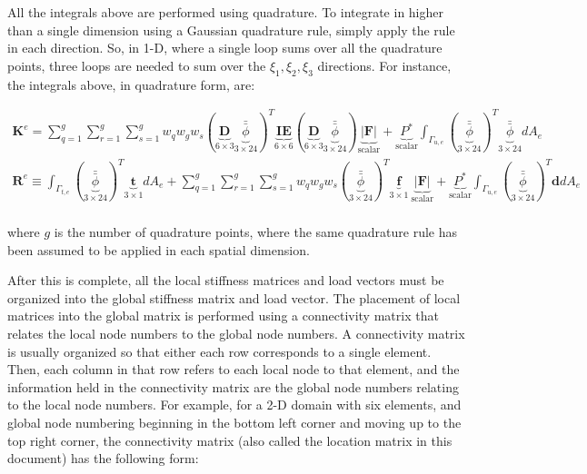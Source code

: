 \documentclass[10pt]{article}
\begin{document}
All the integrals above are performed using quadrature. To integrate in higher than a single dimension using a Gaussian quadrature rule, simply apply the rule in each direction. So, in 1-D, where a single loop sums over all the quadrature points, three loops are needed to sum over the \(\xi_1,\xi_2,\xi_3\) directions. For instance, the integrals above, in quadrature form, are:

\begin{equation}
\label{eq:FEWeakForm_element3}
\begin{aligned}
\textbf{K}^e=\sum_{q=1}^g\sum_{r=1}^g\sum_{s=1}^gw_qw_gw_s(\underbrace{\textbf{D}}_{6\times3}\underbrace{\bar{\bar{\phi}}}_{3\times24})^T\underbrace{\textbf{IE}}_{6\times6}(\underbrace{\textbf{D}}_{6\times3}\underbrace{\bar{\bar{\phi}}}_{3\times24})\underbrace{|\textbf{F}|}_\text{scalar} +\underbrace{P^{*}}_\text{scalar}\int_{\Gamma_{u,e}}(\underbrace{\bar{\bar{\phi}}}_{3\times24})^T\underbrace{\bar{\bar{\phi}}}_{3\times24}dA_e\\
\textbf{R}^e\equiv\int_{\Gamma_{t,e}}(\underbrace{\bar{\bar{\phi}}}_{3\times24})^T\underbrace{\textbf{t}}_{3\times1}dA_e+\sum_{q=1}^g\sum_{r=1}^g\sum_{s=1}^gw_qw_gw_s(\underbrace{\bar{\bar{\phi}}}_{3\times24})^T\underbrace{\textbf{f}}_{3\times1}\ \underbrace{|\textbf{F}|}_\text{scalar}+\underbrace{P^{*}}_\text{scalar}\int_{\Gamma_{u,e}}(\underbrace{\bar{\bar{\phi}}}_{3\times24})^T\textbf{d}dA_e\\
\end{aligned}
\end{equation}

where \(g\) is the number of quadrature points, where the same quadrature rule has been assumed to be applied in each spatial dimension.







After this is complete, all the local stiffness matrices and load vectors must be organized into the global stiffness matrix and load vector. The placement of local matrices into the global matrix is performed using a connectivity matrix that relates the local node numbers to the global node numbers. A connectivity matrix is usually organized so that either each row corresponds to a single element. Then, each column in that row refers to each local node to that element, and the information held in the connectivity matrix are the global node numbers relating to the local node numbers. For example, for a 2-D domain with six elements, and global node numbering beginning in the bottom left corner and moving up to the top right corner, the connectivity matrix (also called the location matrix in this document) has the following form:
\end{document}

